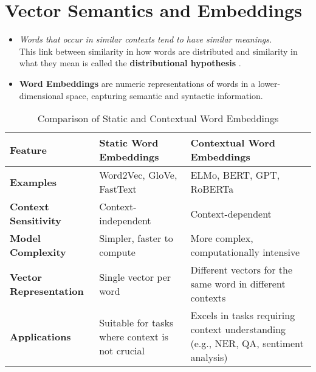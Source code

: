 \chapter{Vector Semantics and Embeddings \cite{nlp-1}}

\begin{itemize}
    \item \textit{Words that occur in similar contexts tend to have similar meanings.}\\ This link between similarity in how words are distributed and similarity in what they mean is called the \textbf{distributional hypothesis}  \label{distributional hypothesis}.

    \item \textbf{Word Embeddings} are numeric representations of words in a lower-dimensional space, capturing semantic and syntactic information. \cite{gfg-word-embeddings-in-nlp}
    
\end{itemize}

\begin{table}[h!]
    \centering
    \begin{tabular}{|p{3cm}|p{5cm}|p{5cm}|}
        \hline
        \textbf{Feature} & \textbf{Static Word Embeddings} & \textbf{Contextual Word Embeddings} \\
        \hline
        \textbf{Examples} & Word2Vec, GloVe, FastText & ELMo, BERT, GPT, RoBERTa \\
        \hline
        \textbf{Context Sensitivity} & Context-independent & Context-dependent \\
        \hline
        \textbf{Model Complexity} & Simpler, faster to compute & More complex, computationally intensive \\
        \hline
        \textbf{Vector Representation} & Single vector per word & Different vectors for the same word in different contexts \\
        \hline
        \textbf{Applications} & Suitable for tasks where context is not crucial & Excels in tasks requiring context understanding (e.g., NER, QA, sentiment analysis) \\
        \hline
    \end{tabular}
    \caption{Comparison of Static and Contextual Word Embeddings \cite{chatgpt}}
\end{table}

